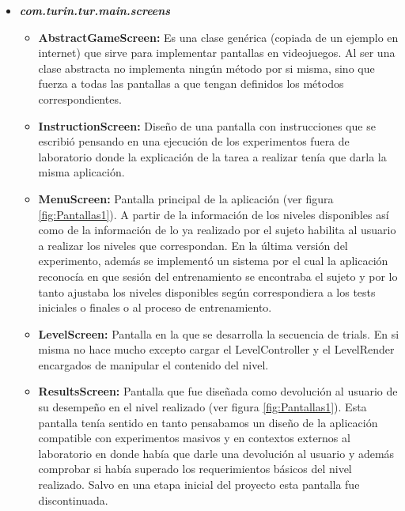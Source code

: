 \documentclass{article}
\numberwithin{figure}{section}
\begin{document}
    \begin{itemize}
        \item \textit{\textbf{com.turin.tur.main.screens}}
        \begin{itemize}
            \item \textbf{AbstractGameScreen:} Es una clase genérica (copiada de un ejemplo en internet) que sirve para implementar pantallas en videojuegos. Al ser una clase abstracta no implementa ningún método por si misma, sino que fuerza a todas las pantallas a que tengan definidos los métodos correspondientes. 
            \item \textbf{InstructionScreen:} Diseño de una pantalla con instrucciones que se escribió pensando en una ejecución de los experimentos fuera de laboratorio donde la explicación de la tarea a realizar tenía que darla la misma aplicación.
            \item \textbf{MenuScreen:} Pantalla principal de la aplicación (ver figura \ref{fig:Pantallas1}). A partir de la información de los niveles disponibles así como de la información de lo ya realizado por el sujeto habilita al usuario a realizar los niveles que correspondan. En la última versión del experimento, además se implementó un sistema por el cual la aplicación reconocía en que sesión del entrenamiento se encontraba el sujeto y por lo tanto ajustaba los niveles disponibles según correspondiera a los tests iniciales o finales o al proceso de entrenamiento. 
            \item \textbf{LevelScreen:} Pantalla en la que se desarrolla la secuencia de trials. En si misma no hace mucho excepto cargar el LevelController y el LevelRender encargados de manipular el contenido del nivel. 
            \item \textbf{ResultsScreen:} Pantalla que fue diseñada como devolución al usuario de su desempeño en el nivel realizado (ver figura \ref{fig:Pantallas1}). Esta pantalla tenía sentido en tanto pensabamos un diseño de la aplicación compatible con experimentos masivos y en contextos externos al laboratorio en donde había que darle una devolución al usuario y además comprobar si había superado los requerimientos básicos del nivel realizado. Salvo en una etapa inicial del proyecto esta pantalla fue discontinuada. 
        \end{itemize}
        

\end{itemize}
\end{document}
